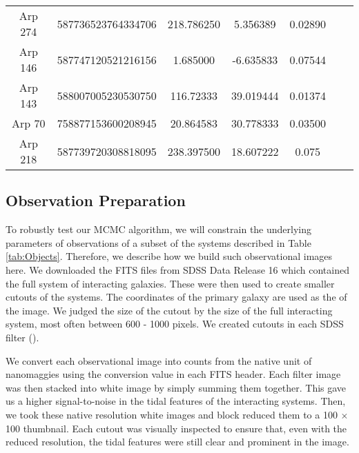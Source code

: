 \begin{table*}
{\begin{tabular}{|c|c|c|c|c|c|c|}
Arp 274 & 587736523764334706 & 218.786250 & 5.356389 & 0.02890 \\
Arp 146 & 587747120521216156 & 1.685000 & -6.635833 & 0.07544 \\
Arp 143 & 588007005230530750 & 116.72333 & 39.019444 & 0.01374 \\
Arp 70 & 758877153600208945 & 20.864583 & 30.778333 & 0.03500 \\
Arp 218 & 587739720308818095 & 238.397500 & 18.607222 & 0.075 \\
\hline
\end{tabular}}
\caption[The names, SDSS ID, right ascension, declination (in degrees) and redshift for the 51 interacting systems we will examine.]{The names, SDSS ID, right ascension, declination (in degrees) and redshift for the 51 interacting systems we will examine. All redshifts are as found on the NASA Extragalactic Database.}
\label{tab:Objects}
\end{table*}

\subsection{Observation Preparation}\label{data:obs-prep}
\noindent To robustly test our MCMC algorithm, we will constrain the underlying parameters of observations of a subset of the systems described in Table \ref{tab:Objects}. Therefore, we describe how we build such observational images here. We downloaded the FITS files from SDSS Data Release 16 which contained the full system of interacting galaxies. These were then used to create smaller cutouts of the systems. The coordinates of the primary galaxy are used as the \DIFdelbegin {}\DIFdelend \DIFaddbegin {}\DIFaddend of the image. We judged the size of the cutout by the size of the full interacting system, most often between 600 - 1000 pixels. We created cutouts in each SDSS filter (\DIFdelbegin {}\DIFdelend \DIFaddbegin {}\DIFaddend ).

We convert each observational image into counts from the native unit of nanomaggies using the conversion value in each FITS header. Each filter image was then stacked into white image by simply summing them together. This gave us a higher signal-to-noise in the tidal features of the interacting systems. Then, we took these native resolution white images and block reduced them to a 100 $\times$ 100 thumbnail. Each cutout was visually inspected to ensure that, even with the reduced resolution, the tidal features were still clear and prominent in the image.

